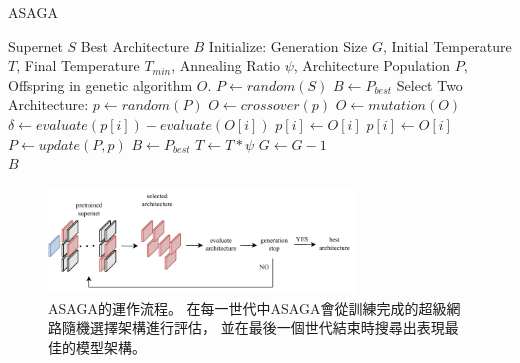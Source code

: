 \documentclass[a4paper,12pt]{extarticle}
\begin{document}
                \begin{algorithm}[htb]
                    \caption{
                        ASAGA
                        \label{alg:ASAGA}
                    }
                    \begin{algorithmic}[1]
                        \Require Supernet $S$
                        \Ensure Best Architecture $B$
                        \State Initialize: Generation Size $G$, Initial Temperature $T$,
                        Final Temperature $T_{min}$, Annealing Ratio $\psi$, Architecture Population $P$,
                        Offspring in genetic algorithm $O$.
                        \State $P \gets random(S)$
                        \State $B \gets P_{best}$
                                \State Select Two Architecture: $p \gets random(P)$
                                \State $O \gets crossover(p)$
                                \State $O \gets mutation(O)$
                                    \State $\delta \gets evaluate(p[i]) - evaluate(O[i])$
                                        \State $p[i] \gets O[i]$
                                        \State $p[i] \gets O[i]$
                                    \EndIf
                                \EndFor
                            \State $P \gets update(P, p)$
                            \EndFor
                            \State $B \gets P_{best}$
                        \EndIf
                        \State $T \gets T*\psi$
                        \State $G \gets G - 1$
                        \EndWhile \\
                        \Return $B$
                    \end{algorithmic}
                \end{algorithm}

            \begin{figure}[htb]
                \centering
                \includegraphics[width=0.725\textwidth]{flow.pdf}
                \caption{
                    ASAGA的運作流程。
                    在每一世代中ASAGA會從訓練完成的超級網路隨機選擇架構進行評估，
                    並在最後一個世代結束時搜尋出表現最佳的模型架構。
                }
                \label{fig:ASAGA}
            \end{figure}
\end{document}
